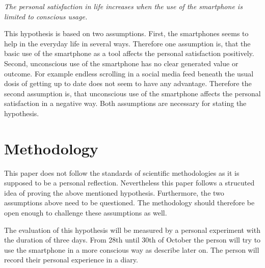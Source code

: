 \documentclass[11pt,letterpaper]{article}
\begin{document}
\begin{center}
\textit{The personal satisfaction in life increases when the use of the smartphone is limited to conscious usage.}
 \end{center}

This hypothesis is based on two assumptions. First, the smartphones seems to help in the everyday life in several ways. Therefore one assumption is, that the basic use of the smartphone as a tool affects the personal satisfaction positively. Second, unconscious use of the smartphone has no clear generated value or outcome. For example endless scrolling in a social media feed beneath the usual dosis of getting up to date does not seem to have any advantage. Therefore the second assumption is, that unconscious use of the smartphone affects the personal satisfaction in a negative way. Both assumptions are necessary for stating the hypothesis.

\section*{Methodology}
This paper does not follow the standards of scientific methodologies as it is supposed to be a personal reflection. Nevertheless this paper follows a strucuted idea of proving the above mentioned hypothesis. Furthermore, the two assumptions above need to be questioned. The methodology should therefore be open enough to challenge these assumptions as well. 

The evaluation of this hypothesis will be measured by a personal experiment with the duration of three days. From 28th until 30th of October the person will try to use the smartphone in a more conscious way as describe later on. The person will record their personal experience in a diary. 
\end{document}
